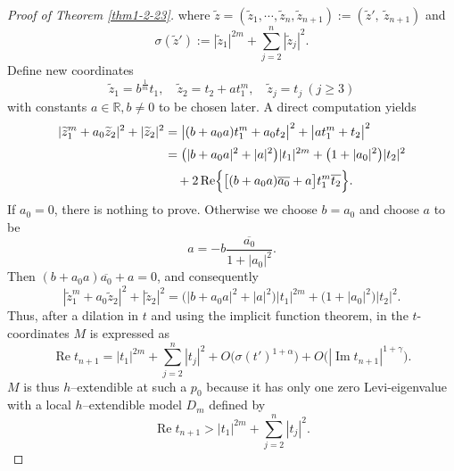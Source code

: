 \documentclass[a4paper,centertags,oneside,12pt]{amsart}
\numberwithin{equation}{section}
\begin{document}
\begin{proof}[Proof of Theorem \ref{thm1-2-23}]
where $\widetilde z=(\widetilde z_1, \cdots, \widetilde z_n, \widetilde z_{n+1}):=(\widetilde z',~ \widetilde z_{n+1})$ and
\[
\sigma(\widetilde z') := |\widetilde z_1|^{2m} + \sum_{j=2}^{n} |\widetilde z_j|^2.
\]
Define new coordinates  
\[
\widetilde z_1 = b^{\frac1m}t_1,\quad \widetilde z_2 = t_2 + a t_1^m,\quad \widetilde z_j = t_j\ (j\ge 3)
\]
with constants \(a\in {\mathbb R}, b\not =0\) to be chosen later.  
A direct computation yields
\[
\begin{split}
|\widetilde z_1^m + a_0 \widetilde z_2|^2 + |\widetilde z_2|^2
&= \bigl|(b + a_0 a) t_1^m + a_0 t_2\bigr|^2 + \bigl|a t_1^m + t_2\bigr|^2 \\[2pt]
&= \bigl(|b + a_0 a|^2 + |a|^2\bigr) |t_1|^{2m} + \bigl(1 + |a_0|^2\bigr)|t_2|^2 \\[2pt]
&\quad + 2\operatorname{Re}\Bigl\{\bigl[(b + a_0 a)\overline{a_0} + a\bigr] t_1^m \overline{t_2}\Bigr\}.
\end{split}
\]
If \(a_0 = 0\), there is nothing to prove. Otherwise we choose \(b={a_0}\) and choose \(a\) to be   
\[
a = -b \frac{\overline{a_0}}{1 + |a_0|^2}.
\]
Then \((b + a_0 a)\overline{a_0}+a= 0\), and consequently  
\[
|\widetilde z_1^m + a_0 \widetilde z_2|^2 + |\widetilde z_2|^2
= \bigl(|b + a_0 a|^2 + |a|^2\bigr) |t_1|^{2m}
+ \bigl(1 + |a_0|^2\bigr)|t_2|^2.
\]
Thus,  after a dilation  in $t$ and using the implicit function theorem,  in the \(t\)-coordinates $M$ is expressed as  
\begin{equation*}
\operatorname{Re} t_{n+1} = |t_1|^{2m} + \sum_{j=2}^{n} |t_j|^2 + O\bigl(\sigma(t')^{1+\alpha}\big)+O\big(|\operatorname{Im}t_{n+1}|^{1+\gamma}\bigr).
\end{equation*}
$M$ is thus $h$--extendible at such a $p_0$ because it has only one zero Levi-eigenvalue  \cite{Yu93} with a local $h$--extendible model $D_m$ defined by $$\operatorname{Re} t_{n+1} > |t_1|^{2m} + \sum_{j=2}^{n} |t_j|^2.$$
\end{proof}
\end{document}
